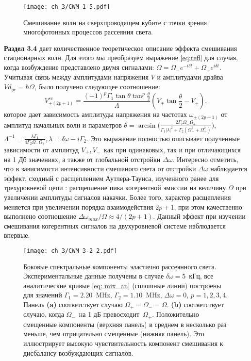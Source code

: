 \begin{figure}[htb]\center
	\texttt{[image: ch\_3/CWM\_1-5.pdf]}
	\caption{Смешивание волн на сверхпроводящем кубите с точки зрения многофотонных процессов рассеяния света.}
	\label{fig: fwm_multphot}
\end{figure}

\textbf{Раздел 3.4} дает количественное теоретическое описание эффекта смешивания стационарных волн. Для этого мы преобразуем выражение \eqref{eq:refl} для случая, когда возбуждение представлено двумя сигналами: $\Omega=\Omega_-e^{-i\delta t}+\Omega_+ e^{i\delta t}$. Учитывая связь между амплитудами напряжения $V$ и амплитудами драйва $Vd_{ge}=\hbar\Omega$, было получено следующее соотношение:
\begin{equation}
V^{sc}_{\pm(2p+1)}=\frac{(-1)^p\Gamma_1\tan\theta\tan^p\frac{\theta}{2}}{\Lambda}(V_\mp \tan\frac{\theta}{2} - V_\pm),
\label{eq: mix_an}
\end{equation}
которое дает зависимость амплитуды напряжения на частотах $\omega_{\pm(2p+1)}$ от амплитуд начальных волн и  параметров $\theta = \arcsin\Big(\frac{2\Gamma_2 \Omega_- \Omega_+}{\Gamma_1 |\lambda|^2 + \Gamma_2(\Omega_-^2 + \Omega_+^2)}\Big)$, $\Lambda^{-1} = \frac{\lambda\Gamma_1}{4\Gamma_2 \Omega_-\Omega_+}, \lambda = \delta\omega-i\Gamma_2$. Это выражение полностью описывает полученные зависимости от амплитуд $V_+,\space V_-$ как при одинаковых, так и при отличающихся на 1 Дб значениях, а также от глобальной отстройки $\Delta\omega$. Интересно отметить, что в зависимости интенсивности смешаного света от отстройки $\Delta\omega$ наблюдается эффект, сходный с расщеплением Аутлера-Таунса, изученного ранее для трехуровневой цепи \cite{ATS_3LS}: расщепление пика когерентной эмиссии на величину $\Omega$ при увеличении амплитуды сигналов накачки. Более того, характер расщепления меняется при увеличении порядка взаимодействия $2p+1$, при этом качественно выполнено соотношение $\Delta\omega_{max}/\Omega \approx 4/(2p+1)$. Данный эффект при изучении смешивания когерентных сигналов на двухуровневой системе наблюдается впервые.  
\begin{figure}[htb]\center
	\texttt{[image: ch\_3/CWM\_3-2\_2.pdf]}
	\caption{ Боковые спектральные компоненты эластично рассеянного света. Экспериментальные данные получены в случае  $\delta\omega=5$~кГц, все аналитические кривые \eqref{eq: mix_an} (сплошные линии) построены для значений $\Gamma_1 = 2.20$~MHz, $\Gamma_2=1.10$~MHz, $\Delta\omega=0$, $p=1,2,3,4$. Панель \textbf{(a)} соответствует случаю $\Omega_+=\Omega_- =\Omega$. \textbf{(b)} соответствует случаю, когда $\Omega_-$~на 1 дБ превосходит~$\Omega_+ $. Положительно смещенные компоненты (верхняя панель) в среднем в несколько раз меньше, чем отрицательно смещенные (нижняя панель). Это иллюстрирует высокую чувствительность компонент смешивания к дисбалансу возбуждающих сигналов.}
	\label{fig: fwm_fits}
\end{figure}


